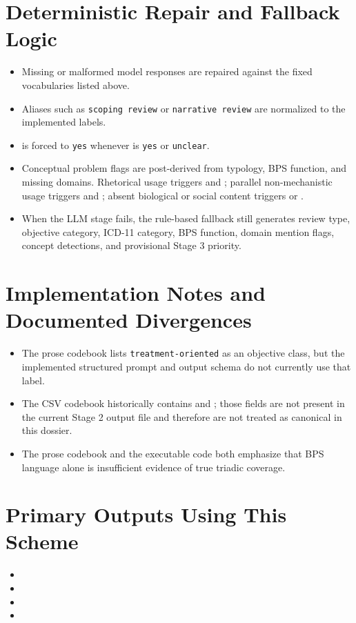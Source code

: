 \documentclass[11pt]{article}
\begin{document}
\section*{Deterministic Repair and Fallback Logic}
\begin{itemize}
\item Missing or malformed model responses are repaired against the fixed vocabularies listed above.
\item Aliases such as \texttt{scoping review} or \texttt{narrative review} are normalized to the implemented labels.
\item {} is forced to \texttt{yes} whenever  is \texttt{yes} or \texttt{unclear}.
\item Conceptual problem flags are post-derived from typology, BPS function, and missing domains. Rhetorical usage triggers  and ; parallel non-mechanistic usage triggers  and ; absent biological or social content triggers  or .
\item When the LLM stage fails, the rule-based fallback still generates review type, objective category, ICD-11 category, BPS function, domain mention flags, concept detections, and provisional Stage 3 priority.
\end{itemize}

\section*{Implementation Notes and Documented Divergences}
\begin{itemize}
\item The prose codebook lists \texttt{treatment-oriented} as an objective class, but the implemented structured prompt and output schema do not currently use that label.
\item The CSV codebook historically contains  and ; those fields are not present in the current Stage 2 output file and therefore are not treated as canonical in this dossier.
\item The prose codebook and the executable code both emphasize that BPS language alone is insufficient evidence of true triadic coverage.
\end{itemize}

\section*{Primary Outputs Using This Scheme}
\begin{itemize}
\item {}
\item {}
\item {}
\item {}
\end{itemize}
\end{document}
